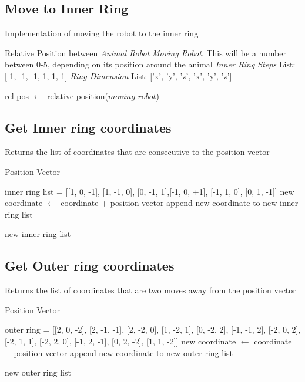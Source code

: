 \subsection{Move to Inner Ring}
\label{function:move to inner ring}
\begin{algorithm}
\caption{Implementation of moving the robot to the inner ring}
 \begin{algorithmic}

\REQUIRE Relative Position between \textit{Animal Robot} \AND \textit{Moving Robot}. This will be a number between 0-5, depending on its position around the animal 
\REQUIRE \textit{Inner Ring Steps} List: [-1, -1, -1, 1, 1, 1]
\REQUIRE \textit{Ring Dimension} List: ['x', 'y', 'z', 'x', 'y', 'z']

\STATE rel pos $\leftarrow$ relative position(\textit{$moving\_robot$})


\end{algorithmic}
\end{algorithm}

\subsection{Get Inner ring coordinates}
\label{function:def_inner_ring}
\begin{algorithm}[H]
\caption{Returns the list of coordinates that are consecutive to the position vector}
\begin{algorithmic}

\REQUIRE Position Vector

inner ring list = [[1, 0, -1], [1, -1, 0], [0, -1, 1],[-1, 0, +1], [-1, 1, 0], [0, 1, -1]]
\STATE new coordinate $\leftarrow$ coordinate + position vector
\STATE append new coordinate to new inner ring list

\ENDFOR
\RETURN new inner ring list


\end{algorithmic}
\end{algorithm}


\subsection{Get Outer ring coordinates}
\label{function:def_outer_ring}
\begin{algorithm}[H]
\caption{Returns the list of coordinates that are two moves away from the position vector}
\begin{algorithmic}

\REQUIRE Position Vector

outer ring = [[2, 0, -2], [2, -1, -1], [2, -2, 0], [1, -2, 1], [0, -2, 2], [-1, -1, 2], [-2, 0, 2], [-2, 1, 1], [-2, 2, 0], [-1, 2, -1], [0, 2, -2], [1, 1, -2]] 
\STATE new coordinate $\leftarrow$ coordinate + position vector
\STATE append new coordinate to new outer ring list

\ENDFOR
\RETURN new outer ring list


\end{algorithmic}
\end{algorithm}





